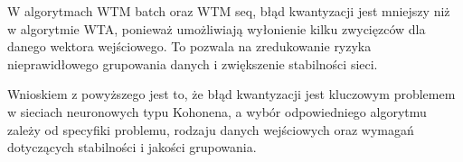 \documentclass[11pt]{article}
\begin{document}
W algorytmach WTM batch oraz WTM seq, błąd kwantyzacji jest mniejszy niż
w algorytmie WTA, ponieważ umożliwiają wyłonienie kilku zwycięzców dla
danego wektora wejściowego. To pozwala na zredukowanie ryzyka
nieprawidłowego grupowania danych i zwiększenie stabilności sieci.

Wnioskiem z powyższego jest to, że błąd kwantyzacji jest kluczowym
problemem w sieciach neuronowych typu Kohonena, a wybór odpowiedniego
algorytmu zależy od specyfiki problemu, rodzaju danych wejściowych oraz
wymagań dotyczących stabilności i jakości grupowania.


    
    
    
\end{document}
